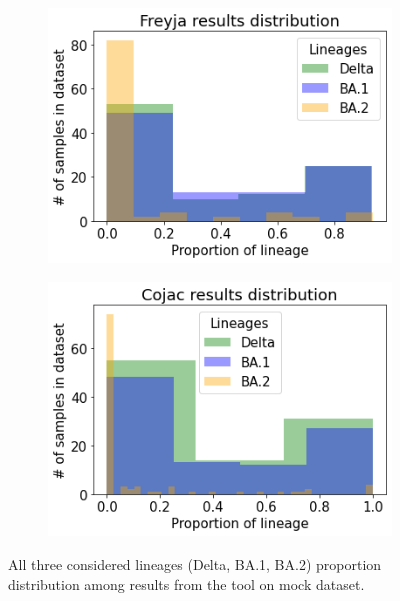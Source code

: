         \begin{figure}[H]
            \centering
            \begin{subfigure}[b]{0.45\textwidth}
            \includegraphics[width=1\textwidth]{figures/results/mock/distr-freyja.png}
            \label{fig:results:mock:dist-freyja-all}
            \end{subfigure}
            \hfill
            \begin{subfigure}[b]{0.45\textwidth}
            \includegraphics[width=1\textwidth]{figures/results/mock/distr-cojac.png}
            \label{fig:results:mock:dist-cojac-all}
            \end{subfigure}
            \caption{All three considered lineages (Delta, BA.1, BA.2) proportion distribution among results from the tool on mock dataset.}
        \end{figure}
        
